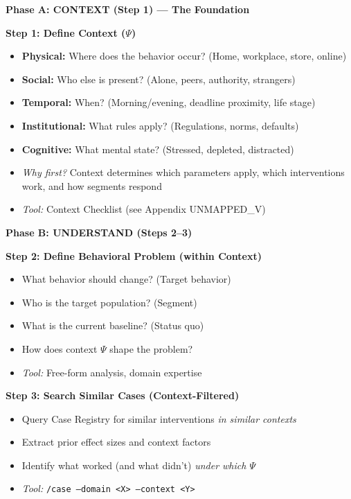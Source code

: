 \begin{tcolorbox}[colback=blue!5!white,colframe=blue!75!black,
    title=\textbf{7-Step Workflow: Context $\to$ Model $\to$ Portfolio $\to$ Learn}]

\textbf{Phase A: CONTEXT (Step 1) --- The Foundation}

\textbf{Step 1: Define Context ($\Psi$)}
\begin{itemize}[noitemsep]
    \item \textbf{Physical:} Where does the behavior occur? (Home, workplace, store, online)
    \item \textbf{Social:} Who else is present? (Alone, peers, authority, strangers)
    \item \textbf{Temporal:} When? (Morning/evening, deadline proximity, life stage)
    \item \textbf{Institutional:} What rules apply? (Regulations, norms, defaults)
    \item \textbf{Cognitive:} What mental state? (Stressed, depleted, distracted)
    \item \textit{Why first?} Context determines which parameters apply, which interventions work, and how segments respond
    \item \textit{Tool:} Context Checklist (see Appendix UNMAPPED_V)
\end{itemize}

\vspace{1em}
\textbf{Phase B: UNDERSTAND (Steps 2--3)}

\textbf{Step 2: Define Behavioral Problem (within Context)}
\begin{itemize}[noitemsep]
    \item What behavior should change? (Target behavior)
    \item Who is the target population? (Segment)
    \item What is the current baseline? (Status quo)
    \item How does context $\Psi$ shape the problem?
    \item \textit{Tool:} Free-form analysis, domain expertise
\end{itemize}

\textbf{Step 3: Search Similar Cases (Context-Filtered)}
\begin{itemize}[noitemsep]
    \item Query Case Registry for similar interventions \textit{in similar contexts}
    \item Extract prior effect sizes and context factors
    \item Identify what worked (and what didn't) \textit{under which $\Psi$}
    \item \textit{Tool:} \texttt{/case --domain <X> --context <Y>}
\end{itemize}


\end{tcolorbox}
